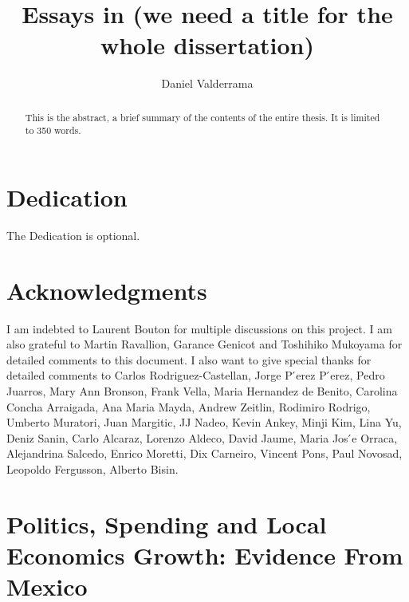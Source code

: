 \documentclass[12pt]{report}
\title{Essays in (we need a title for the whole dissertation)}
\author{Daniel Valderrama}
\begin{document}

\maketitle    %

\begin{abstract}
This is the abstract, a brief summary of the contents of the entire thesis.
It is limited to 350 words.


\end{abstract}


\chapter*{Dedication}

The Dedication is optional.


\chapter*{Acknowledgments}

I am indebted to Laurent Bouton for multiple discussions on this project. I am also grateful to Martin
Ravallion, Garance Genicot and Toshihiko Mukoyama for detailed comments to this document. I also want
to give special thanks for detailed comments to Carlos Rodriguez-Castellan, Jorge P ́erez P ́erez, Pedro Juarros,
Mary Ann Bronson, Frank Vella, Maria Hernandez de Benito, Carolina Concha Arraigada, Ana Maria Mayda,
Andrew Zeitlin, Rodimiro Rodrigo, Umberto Muratori, Juan Margitic, JJ Nadeo, Kevin Ankey, Minji Kim, Lina
Yu, Deniz Sanin, Carlo Alcaraz, Lorenzo Aldeco, David Jaume, Maria Jos ́e Orraca, Alejandrina Salcedo, Enrico
Moretti, Dix Carneiro, Vincent Pons, Paul Novosad, Leopoldo Fergusson, Alberto Bisin.





\tableofcontents

\listoffigures  %
\listoftables   %

\newpage


\chapter{Politics, Spending and Local Economics Growth:
Evidence From Mexico}\label{chap:c1}
\end{document}
